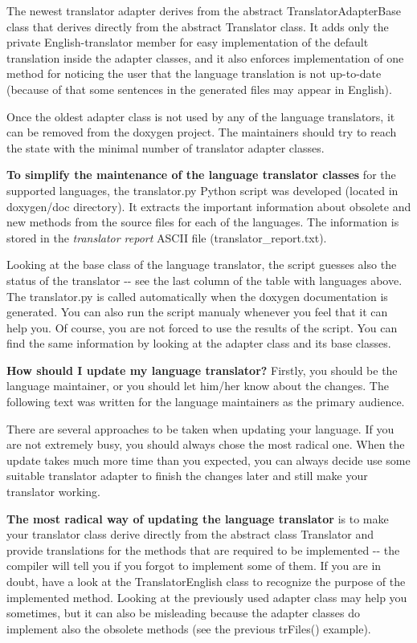 The newest translator adapter derives from the abstract {\ttfamily TranslatorAdapterBase} class that derives directly from the abstract {\ttfamily Translator} class. It adds only the private English-\/translator member for easy implementation of the default translation inside the adapter classes, and it also enforces implementation of one method for noticing the user that the language translation is not up-\/to-\/date (because of that some sentences in the generated files may appear in English).

Once the oldest adapter class is not used by any of the language translators, it can be removed from the doxygen project. The maintainers should try to reach the state with the minimal number of translator adapter classes.

{\bfseries To simplify the maintenance of the language translator classes} for the supported languages, the {\ttfamily translator.py} Python script was developed (located in {\ttfamily doxygen/doc} directory). It extracts the important information about obsolete and new methods from the source files for each of the languages. The information is stored in the {\itshape translator report\/} ASCII file (translator\_\-report.txt).



Looking at the base class of the language translator, the script guesses also the status of the translator -\/-\/ see the last column of the table with languages above. The {\ttfamily translator.py} is called automatically when the doxygen documentation is generated. You can also run the script manualy whenever you feel that it can help you. Of course, you are not forced to use the results of the script. You can find the same information by looking at the adapter class and its base classes.

{\bfseries How should I update my language translator?} Firstly, you should be the language maintainer, or you should let him/her know about the changes. The following text was written for the language maintainers as the primary audience.

There are several approaches to be taken when updating your language. If you are not extremely busy, you should always chose the most radical one. When the update takes much more time than you expected, you can always decide use some suitable translator adapter to finish the changes later and still make your translator working.

{\bfseries The most radical way of updating the language translator} is to make your translator class derive directly from the abstract class {\ttfamily Translator} and provide translations for the methods that are required to be implemented -\/-\/ the compiler will tell you if you forgot to implement some of them. If you are in doubt, have a look at the {\ttfamily TranslatorEnglish} class to recognize the purpose of the implemented method. Looking at the previously used adapter class may help you sometimes, but it can also be misleading because the adapter classes do implement also the obsolete methods (see the previous {\ttfamily trFiles()} example).

